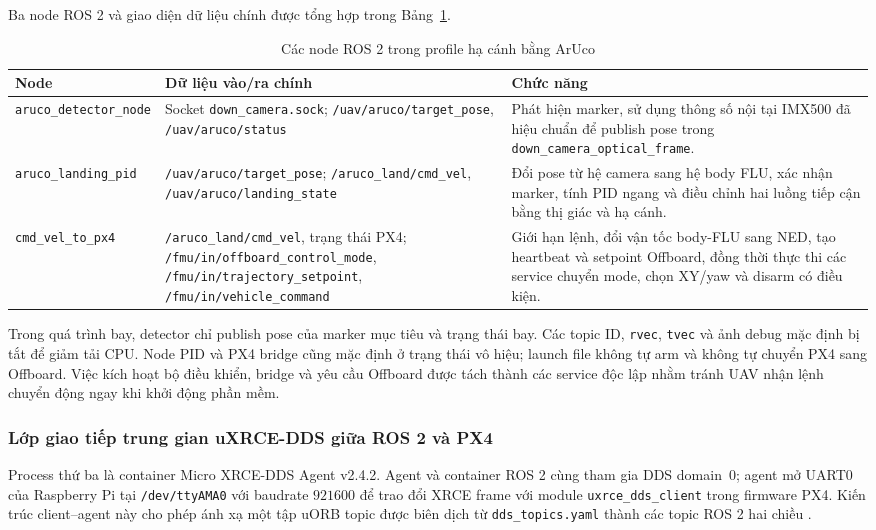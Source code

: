 Ba node ROS 2 và giao diện dữ liệu chính được tổng hợp trong Bảng~\ref{tab:aruco_ros_nodes}.

\begin{table}[H]
\centering
\small
\caption{Các node ROS 2 trong profile hạ cánh bằng ArUco}
\label{tab:aruco_ros_nodes}
\begin{tabularx}{\textwidth}{>{\raggedright\arraybackslash}p{} >{\raggedright\arraybackslash}p{} X}
\toprule
\textbf{Node} & \textbf{Dữ liệu vào/ra chính} & \textbf{Chức năng} \\
\midrule
\texttt{aruco\_detector\_node}
& Socket \texttt{down\_camera.sock};
\texttt{/uav/aruco/target\_pose},
\texttt{/uav/aruco/status}
& Phát hiện marker, sử dụng thông số nội tại IMX500 đã hiệu chuẩn để publish pose trong \texttt{down\_camera\_optical\_frame}. \\
\addlinespace
\texttt{aruco\_landing\_pid}
& \texttt{/uav/aruco/target\_pose};
\texttt{/aruco\_land/cmd\_vel},
\texttt{/uav/aruco/landing\_state}
& Đổi pose từ hệ camera sang hệ body FLU, xác nhận marker, tính PID ngang và điều chỉnh hai luồng tiếp cận bằng thị giác và hạ cánh. \\
\addlinespace
\texttt{cmd\_vel\_to\_px4}
& \texttt{/aruco\_land/cmd\_vel}, trạng thái PX4;
\texttt{/fmu/in/offboard\_control\_mode},
\texttt{/fmu/in/trajectory\_setpoint},
\texttt{/fmu/in/vehicle\_command}
& Giới hạn lệnh, đổi vận tốc body-FLU sang NED, tạo heartbeat và setpoint Offboard, đồng thời thực thi các service chuyển mode, chọn XY/yaw và disarm có điều kiện. \\
\bottomrule
\end{tabularx}
\end{table}

Trong quá trình bay, detector chỉ publish pose của marker mục tiêu và trạng thái bay. Các topic ID, \texttt{rvec}, \texttt{tvec} và ảnh debug mặc định bị tắt để giảm tải CPU. Node PID và PX4 bridge cũng mặc định ở trạng thái vô hiệu; launch file không tự arm và không tự chuyển PX4 sang Offboard. Việc kích hoạt bộ điều khiển, bridge và yêu cầu Offboard được tách thành các service độc lập nhằm tránh UAV nhận lệnh chuyển động ngay khi khởi động phần mềm.

\subsubsection{Lớp giao tiếp trung gian uXRCE-DDS giữa ROS 2 và PX4}

Process thứ ba là container Micro XRCE-DDS Agent v2.4.2. Agent và container ROS 2 cùng tham gia DDS domain~0; agent mở UART0 của Raspberry Pi tại \texttt{/dev/ttyAMA0} với baudrate $921600$ để trao đổi XRCE frame với module \texttt{uxrce\_dds\_client} trong firmware PX4. Kiến trúc client--agent này cho phép ánh xạ một tập uORB topic được biên dịch từ \texttt{dds\_topics.yaml} thành các topic ROS 2 hai chiều \cite{px4v117uxrcedds}.

